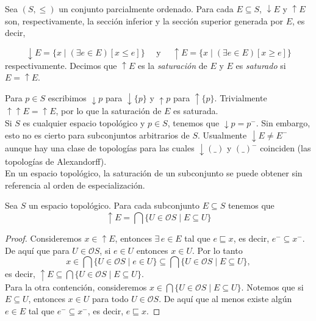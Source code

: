 \begin{dfn}\label{SupInf}
    Sea $(S, \leq)$ un conjunto parcialmente ordenado. Para cada $E\subseteq S$, $\downarrow{E}$ y $\uparrow{E}$ son, respectivamente, la sección inferior y la sección superior generada por $E$, es decir,

    \[
    \downarrow{E}=\{x\mid (\exists e\in E) [x\leq e]\}\quad \mbox{ y } \quad \uparrow{E}=\{x\mid (\exists e\in E) [x\geq e]\}
    \]
    respectivamente. Decimos que $\uparrow{E}$ es la \emph{saturación} de $E$ y $E$ es \emph{saturado} si $E=\uparrow{E}$.
\end{dfn}

Para $p\in S$ escribimos $\downarrow{p}$ para $\downarrow{\{p\}}$ y $\uparrow{p}$ para $\uparrow{\{p\}}$. Trivialmente $\uparrow\uparrow{E}=\uparrow{E}$, por lo que la saturación de $E$ es saturada.\\

Si $S$ es cualquier espacio topológico y $p\in S$, tenemos que $\downarrow{p}=p^-$. Sin embargo, esto no es cierto para subconjuntos arbitrarios de $S$. Usualmente $\downarrow{E}\neq E^-$ aunque hay una clase de topologías para las cuales $\downarrow{(\_)}$ y $(\_)^-$ coinciden (las topologías de Alexandorff).\\

En un espacio topológico, la saturación de un subconjunto se puede obtener sin referencia al orden de especialización.

\begin{lem}\label{LemSup}
    Sea $S$ un espacio topológico. Para cada subconjunto $E\subseteq S$ tenemos que
    \[
    \uparrow{E}=\bigcap\{U\in \mathcal{O}S\mid E\subseteq U\}
    \]
\end{lem}

\begin{proof}
    Consideremos $x\in \uparrow{E}$, entonces $\exists\, e\in E$ tal que $e \sqsubseteq x$, es decir, $e^-\subseteq x^-$. De aquí que para $U\in\mathcal{O}S$, si $e\in U$ entonces $x\in U$. Por lo tanto
    \[
    x\in \bigcap \{U\in \mathcal{O}S\mid e\in U\}\subseteq \bigcap \{U\in \mathcal{O}S\mid E\subseteq U\},
    \]
    es decir, $\uparrow E\subseteq \bigcap \{U\in \mathcal{O}S\mid E\subseteq U\}$.\\

    Para la otra contención, consideremos $x\in \bigcap\{U\in \mathcal{O}S\mid E\subseteq U\}$. Notemos que si $E\subseteq U$, entonces $x\in U$ para todo $U\in \mathcal{O}S$. De aquí que al menos existe algún $e\in E$ tal que $e^-\subseteq x^-$, es decir, $e\sqsubseteq x$. 
\end{proof}

